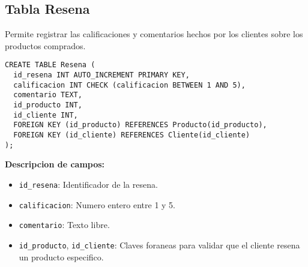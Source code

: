 \subsection{Tabla Resena}

Permite registrar las calificaciones y comentarios hechos por los clientes sobre los productos comprados.

\begin{lstlisting}
CREATE TABLE Resena (
  id_resena INT AUTO_INCREMENT PRIMARY KEY,
  calificacion INT CHECK (calificacion BETWEEN 1 AND 5),
  comentario TEXT,
  id_producto INT,
  id_cliente INT,
  FOREIGN KEY (id_producto) REFERENCES Producto(id_producto),
  FOREIGN KEY (id_cliente) REFERENCES Cliente(id_cliente)
);
\end{lstlisting}

\textbf{Descripcion de campos:}

\begin{itemize}
  \item \texttt{id\_resena}: Identificador de la resena.
  \item \texttt{calificacion}: Numero entero entre 1 y 5.
  \item \texttt{comentario}: Texto libre.
  \item \texttt{id\_producto}, \texttt{id\_cliente}: Claves foraneas para validar que el cliente resena un producto especifico.
\end{itemize}


